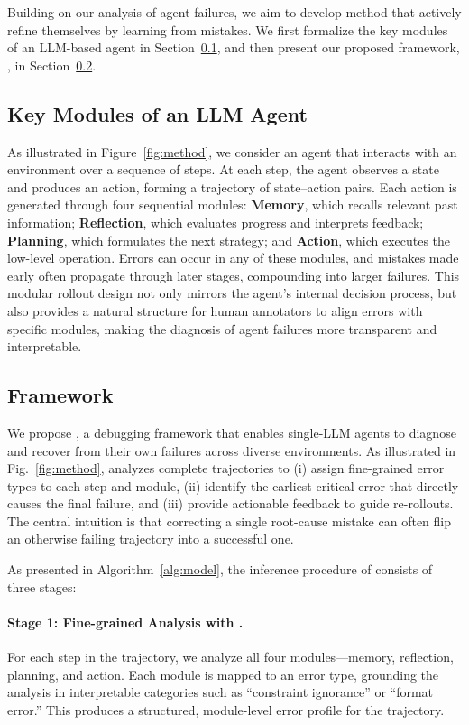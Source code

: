 Building on our analysis of agent failures, we aim to develop method that actively refine themselves by learning from mistakes. We first formalize the key modules of an LLM-based agent in Section~\ref{sec:rollout}, and then present our proposed framework, \ModelName{}, in Section~\ref{sec:model}.


\subsection{Key Modules of an LLM Agent}
\label{sec:rollout}
As illustrated in Figure~\ref{fig:method}, we consider an agent that interacts with an environment over a sequence of steps.  
At each step, the agent observes a state and produces an action, forming a trajectory of state–action pairs.  
Each action is generated through four sequential modules: \textbf{Memory}, which recalls relevant past information; \textbf{Reflection}, which evaluates progress and interprets feedback; \textbf{Planning}, which formulates the next strategy; and \textbf{Action}, which executes the low-level operation.  
Errors can occur in any of these modules, and mistakes made early often propagate through later stages, compounding into larger failures.  This modular rollout design not only mirrors the agent’s internal decision process, but also provides a natural structure for human annotators to align errors with specific modules, making the diagnosis of agent failures more transparent and interpretable.  

\subsection{\ModelName{} Framework}
\label{sec:model}
We propose \ModelName{}, a debugging framework that enables single-LLM agents to diagnose and recover from their own failures across diverse environments. As illustrated in Fig.~\ref{fig:method}, \ModelName{} analyzes complete trajectories to (i) assign fine-grained error types to each step and module, (ii) identify the earliest critical error that directly causes the final failure, and (iii) provide actionable feedback to guide re-rollouts. The central intuition is that correcting a single root-cause mistake can often flip an otherwise failing trajectory into a successful one.

As presented in Algorithm~\ref{alg:model}, the inference procedure of \ModelName{} consists of three stages:

\paragraph{Stage 1: Fine-grained Analysis with \AET{}.}  
For each step in the trajectory, we analyze all four modules—memory, reflection, planning, and action.  
Each module is mapped to an \AET{} error type, grounding the analysis in interpretable categories such as “constraint ignorance” or “format error.”  
This produces a structured, module-level error profile for the trajectory.  

